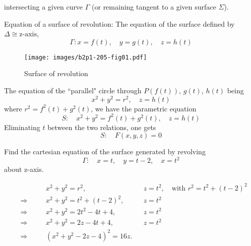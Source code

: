 \documentclass[11pt]{amsbook}
\begin{document}

\noindent intersecting a given curve $\Gamma$ (or remaining tangent to a given surface $\Sigma$).

\begin{defn}
Equation of a surface of revolution: The equation of the surface defined by $\Delta \cong \text{z-axis}$,
\[
\Gamma: x = f(t), \quad y=g(t), \quad z=h(t)
\]
\end{defn} 

\begin{figure}[htbp]
        \centering
            \centering
            \texttt{[image: images/b2p1-205-fig01.pdf]}
	        \caption{Surface of revolution}
        	\label{fig:SurfaceOfRevolution}
    \end{figure}   

\begin{hSolution}
The equation of the ``parallel" circle through $P(f(t))$, $g(t)$, $h(t)$ being
\[    
x^2+y^2=r^2, \quad z=h(t)
\]
where $r^2=f^2(t)+g^2(t)$, we have the parametric equation
\[    
S:\quad x^2+y^2 = f^2(t)+g^2(t),\quad z=h(t)
\]
Eliminating $t$ between the two relations, one gets
\[    
S:\quad F(x,y,z) = 0
\]
\end{hSolution}

\begin{exmp}
Find the cartesian equation of the surface generated by revolving
\[    
\Gamma:\quad x=t,\quad y=t-2, \quad x=t^2
\]
about z-axis.
\end{exmp}

\begin{hSolution}
\begin{align*}
& &&x^2+y^2=r^2, &&z=t^2, \quad \text{with } r^2=t^2+(t-2)^2\\
&\Rightarrow \quad && x^2+y^2=t^2+(t-2)^2, &&z=t^2\\
&\Rightarrow \quad && x^2+y^2=2t^2-4t+4,\quad&& z=t^2\\
&\Rightarrow \quad && x^2+y^2=2z-4t+4, &&z=t^2\\
&\Rightarrow \quad && (x^2+y^2-2z-4)^2 = 16z.\\
\end{align*}
\end{hSolution}

\end{document}
